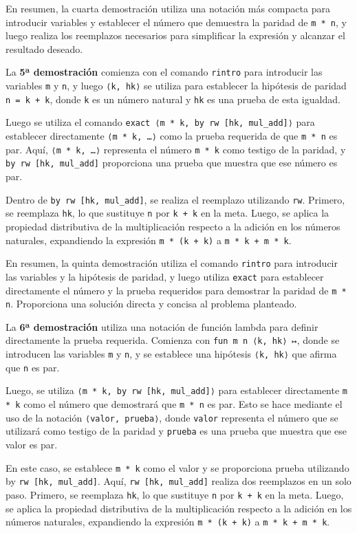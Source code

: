 En resumen, la cuarta demostración utiliza una notación más compacta
para introducir variables y establecer el número que demuestra la
paridad de \texttt{m * n}, y luego realiza los reemplazos necesarios para
simplificar la expresión y alcanzar el resultado deseado.

La \textbf{5ª demostración} comienza con el comando \texttt{rintro} para introducir
las variables \texttt{m} y \texttt{n}, y luego \texttt{⟨k, hk⟩} se utiliza para establecer la
hipótesis de paridad \texttt{n = k + k}, donde \texttt{k} es un número natural y \texttt{hk}
es una prueba de esta igualdad.

Luego se utiliza el comando \texttt{exact ⟨m * k, by rw [hk, mul\_add]⟩} para
establecer directamente \texttt{⟨m * k, …⟩} como la prueba requerida de que
\texttt{m * n} es par. Aquí, \texttt{⟨m * k, …⟩} representa el número \texttt{m * k} como
testigo de la paridad, y \texttt{by rw [hk, mul\_add]} proporciona una prueba
que muestra que ese número es par.

Dentro de \texttt{by rw [hk, mul\_add]}, se realiza el reemplazo utilizando
\texttt{rw}. Primero, se reemplaza \texttt{hk}, lo que sustituye \texttt{n} por \texttt{k + k} en la
meta. Luego, se aplica la propiedad distributiva de la multiplicación
respecto a la adición en los números naturales, expandiendo la expresión
\texttt{m * (k + k)} a \texttt{m * k + m * k}.

En resumen, la quinta demostración utiliza el comando \texttt{rintro} para
introducir las variables y la hipótesis de paridad, y luego utiliza
\texttt{exact} para establecer directamente el número y la prueba requeridos
para demostrar la paridad de \texttt{m * n}. Proporciona una solución directa y
concisa al problema planteado.

La \textbf{6ª demostración} utiliza una notación de función lambda para
definir directamente la prueba requerida. Comienza con
\texttt{fun m n ⟨k, hk⟩ ↦}, donde se introducen las variables \texttt{m} y \texttt{n}, y se
establece una hipótesis \texttt{⟨k, hk⟩} que afirma que \texttt{n} es par.

Luego, se utiliza \texttt{⟨m * k, by rw [hk, mul\_add]⟩} para establecer
directamente \texttt{m * k} como el número que demostrará que \texttt{m * n} es
par. Esto se hace mediante el uso de la notación \texttt{⟨valor, prueba⟩},
donde \texttt{valor} representa el número que se utilizará como testigo de la
paridad y \texttt{prueba} es una prueba que muestra que ese valor es par.

En este caso, se establece \texttt{m * k} como el valor y se proporciona prueba
utilizando by \texttt{rw [hk, mul\_add]}. Aquí, \texttt{rw [hk, mul\_add]} realiza dos
reemplazos en un solo paso. Primero, se reemplaza \texttt{hk}, lo que sustituye
\texttt{n} por \texttt{k + k} en la meta. Luego, se aplica la propiedad distributiva
de la multiplicación respecto a la adición en los números naturales,
expandiendo la expresión \texttt{m * (k + k)} a \texttt{m * k + m * k}.

